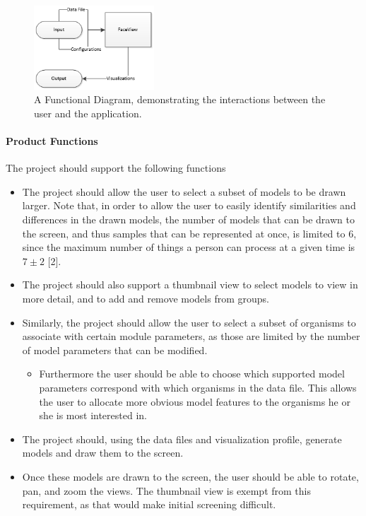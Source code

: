 \documentclass[letterpaper,10pt, onecolumn, draftclsnofoot]{IEEEtran}
\begin{document}
\begin{figure}[h]
	\includegraphics[width=0.4\textwidth]{functional.PNG}
	\caption{A Functional Diagram, demonstrating the interactions between the user and the application.}
	\label{fig:functional}
\end{figure}

\paragraph{Product Functions}
The project should support the following functions

\begin{itemize}
	\item The project should allow the user to select a subset of models to be drawn larger. Note that, in order to allow the user to easily identify similarities and differences in the drawn models, the number of models that can be drawn to the screen, and thus samples that can be represented at once, is limited to 6, since the maximum number of things a person can process at a given time is $7\pm2$ [2].
	\item The project should also support a thumbnail view to select models to view in more detail, and to add and remove models from groups.
	\item Similarly, the project should allow the user to select a subset of organisms to associate with certain module parameters, as those are limited by the number of model parameters that can be modified. 
	\begin{itemize}
		\item Furthermore the user should be able to choose which supported model parameters correspond with which organisms in the data file. This allows the user to allocate more obvious model features to the organisms he or she is most interested in.
	\end{itemize}
	\item The project should, using the data files and visualization profile, generate models and draw them to the screen.
	\item Once these models are drawn to the screen, the user should be able to rotate, pan, and zoom the views. The thumbnail view is exempt from this requirement, as that would make initial screening difficult.
\end{itemize}
\end{document}
